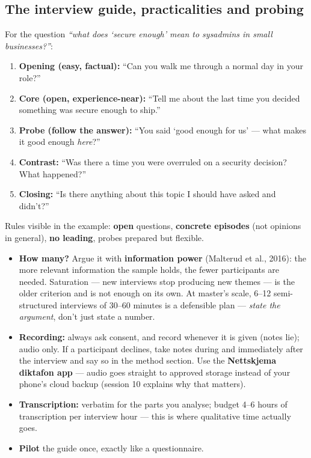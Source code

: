 \documentclass[11pt,a4paper,british,twoside=false,headings=small,chapterprefix=false,numbers=noenddot]{scrbook}
\begin{document}
\subsection{The interview guide, practicalities and probing}
\begin{center}\small
For the question \emph{``what does `secure enough' mean to sysadmins in
  small businesses?''}:
  
  \small
  \begin{enumerate}\setlength{\itemsep}{0.35em}
    \item \textbf{Opening (easy, factual):} ``Can you walk me through a
          normal day in your role?''
    \item \textbf{Core (open, experience-near):} ``Tell me about the last
          time you decided something was secure enough to ship.''
    \item \textbf{Probe (follow the answer):} ``You said `good enough for
          us' --- what makes it good enough \emph{here}?''
    \item \textbf{Contrast:} ``Was there a time you were overruled on a
          security decision? What happened?''
    \item \textbf{Closing:} ``Is there anything about this topic I should
          have asked and didn't?''
  \end{enumerate}
  
  Rules visible in the example: \textbf{open} questions, \textbf{concrete
  episodes} (not opinions in general), \textbf{no leading}, probes prepared
  but flexible.
\end{center}

\begin{center}\small
\begin{itemize}\setlength{\itemsep}{0.45em}
    \item \textbf{How many?} Argue it with \textbf{information power}
          (Malterud et al., 2016): the more relevant information the sample
          holds, the fewer participants are needed. Saturation --- new
          interviews stop producing new themes --- is the older criterion
          and is not enough on its own. At master's scale, 6--12
          semi-structured interviews of 30--60 minutes is a defensible plan
          --- \emph{state the argument}, don't just state a number.
    \item \textbf{Recording:} always ask consent, and record whenever it is
          given (notes lie); audio only. If a participant declines, take notes
          during and immediately after the interview and say so in the method
          section. Use the \textbf{Nettskjema diktafon app} --- audio goes
          straight to approved storage instead of your phone's cloud backup
          (session 10 explains why that matters).
    \item \textbf{Transcription:} verbatim for the parts you analyse; budget
          4--6 hours of transcription per interview hour --- this is where
          qualitative time actually goes.
    \item \textbf{Pilot} the guide once, exactly like a questionnaire.
  \end{itemize}
\end{center}
\end{document}
